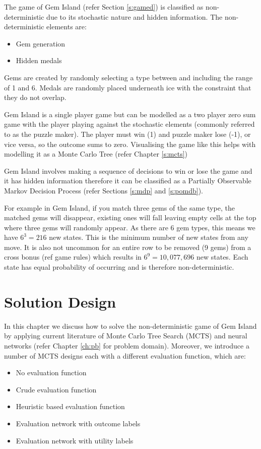 \documentclass{bhamthesis}
\theoremstyle{definition}
\begin{document}
The game of Gem Island (refer Section \ref{s:gamed}) is classified as non-deterministic due to its stochastic nature and hidden information. The non-deterministic elements are:
\begin{itemize}
	\item Gem generation
	\item Hidden medals
\end{itemize}

Gems are created by randomly selecting a type between and including the range of 1 and 6. Medals are randomly placed underneath ice with the constraint that they do not overlap.

Gem Island is a single player game but can be modelled as a two player zero sum game with the player playing against the stochastic elements (commonly referred to as the puzzle maker). The player must win (1) and puzzle maker lose (-1), or vice versa, so the outcome sums to zero. Visualising the game like this helps with modelling it as a Monte Carlo Tree (refer Chapter \ref{s:mcts})

Gem Island involves making a sequence of decisions to win or lose the game and it has hidden information therefore it can be classified as a Partially Observable Markov Decision Process (refer Sections \ref{s:mdp} and \ref{s:pomdb}).

For example in Gem Island, if you match three gems of the same type, the matched gems will disappear, existing ones will fall leaving empty cells at the top where three gems will randomly appear. As there are 6 gem types, this means we have $6^3 = 216$ new states. This is the minimum number of new states from any move. It is also not uncommon for an entire row to be removed (9 gems) from a cross bonus (ref game rules) which results in $6^9=10,077,696$ new states. Each state has equal probability of occurring and is therefore non-deterministic.



\chapter{Solution Design}
In this chapter we discuss how to solve the non-deterministic game of Gem Island by applying current literature of Monte Carlo Tree Search (MCTS) and neural networks (refer Chapter \ref{ch:pb} for problem domain). Moreover, we introduce a number of MCTS designs each with a different evaluation function, which are:

\begin{itemize}
	\item No evaluation function
	\item Crude evaluation function
	\item Heuristic based evaluation function
	\item Evaluation network with outcome labels
	\item Evaluation network with utility labels
\end{itemize}
\end{document}
